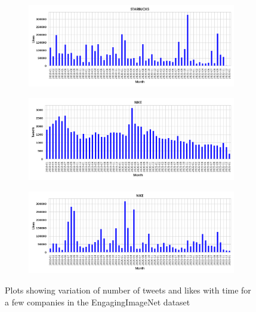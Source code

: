 \begin{figure}[t]
\begin{subfigure}[b]{0.45\textwidth}
         \caption{}
    \end{subfigure}
    \begin{subfigure}[b]{0.45\textwidth}
         \centering
         \includegraphics[width=1\columnwidth,scale=1]{images/company_tweets_vs_time/starbucks_likes.png}
         \caption{}
    \end{subfigure}
    \begin{subfigure}[b]{0.45\textwidth}
         \centering
         \includegraphics[width=1\columnwidth,scale=1]{images/company_tweets_vs_time/nike_tweets.png}
         \caption{}
    \end{subfigure}
    \begin{subfigure}[b]{0.45\textwidth}
         \centering
         \includegraphics[width=1\columnwidth,scale=1]{images/company_tweets_vs_time/nike_likes.png}
         \caption{}
    \end{subfigure}
   
     \caption{Plots showing variation of number of tweets and likes with time for a few companies in the EngagingImageNet dataset \label{fig:company_tweets_vs_time}}
\end{figure}


